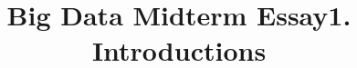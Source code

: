 \documentclass[11pt]{article}
\title{Big Data Midterm Essay}
\begin{document}
\title{1. Introductions}
\end{document}
